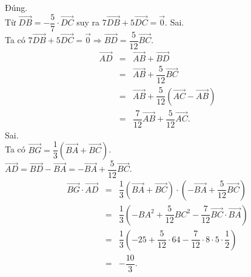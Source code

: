 \begin{ex}
{\begin{itemchoice}
		\itemch Đúng.\\
		Từ $\overrightarrow{DB} = - \dfrac{5}{7} \cdot \overrightarrow{DC}$ suy ra $7\overrightarrow{DB} + 5 \overrightarrow{DC}= \overrightarrow{0}$.
		\itemch Sai.\\
		Ta có  $7\overrightarrow{DB} + 5 \overrightarrow{DC}= \overrightarrow{0} \Rightarrow \overrightarrow{BD} = \dfrac{5}{12} \overrightarrow{BC}$.\\
		\begin{eqnarray*}
			\overrightarrow{AD} & = & \overrightarrow{AB} + \overrightarrow{BD}\\
			& = & \overrightarrow{AB} + \dfrac{5}{12} \overrightarrow{BC}\\
			& = & \overrightarrow{AB} + \dfrac{5}{12} \left( \overrightarrow{AC} - \overrightarrow{AB} \right)\\
			& = & \dfrac{7}{12} \overrightarrow{AB} + \dfrac{5}{12} \overrightarrow{AC}.
		\end{eqnarray*}
		\itemch Sai.\\
		Ta có $\overrightarrow{BG} = \dfrac{1}{3} \left( \overrightarrow{BA} + \overrightarrow{BC} \right)$.\\
		$\overrightarrow{AD} = \overrightarrow{BD} - \overrightarrow{BA} = -\overrightarrow{BA} + \dfrac{5}{12} \overrightarrow{BC}$.\\
		\begin{eqnarray*}
			\overrightarrow{BG} \cdot \overrightarrow{AD} & = & \dfrac{1}{3} \left( \overrightarrow{BA} + \overrightarrow{BC} \right) \cdot \left( -\overrightarrow{BA} + \dfrac{5}{12} \overrightarrow{BC} \right)\\
			& = & \dfrac{1}{3} \left( -BA^2 + \dfrac{5}{12} BC^2 - \dfrac{7}{12} \overrightarrow{BC} \cdot \overrightarrow{BA} \right)\\
			& = & \dfrac{1}{3} \left( -25 + \dfrac{5}{12} \cdot 64 - \dfrac{7}{12} \cdot 8 \cdot 5 \cdot \dfrac{1}{2} \right)\\
			& = &  -\dfrac{10}{3}.
		\end{eqnarray*}
	\end{itemchoice}
	}
\end{ex}


